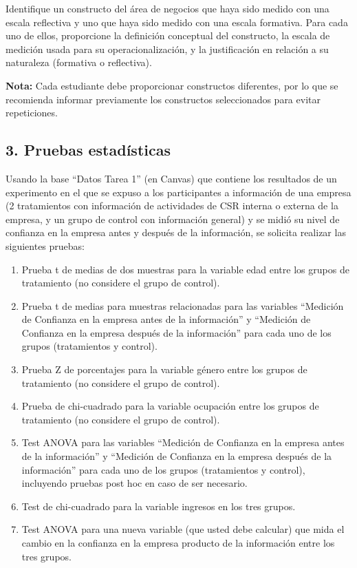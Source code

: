 \documentclass[12pt,letterpaper]{article}
\begin{document}
Identifique un constructo del área de negocios que haya sido medido con una escala reflectiva y uno que haya sido medido con una escala formativa. Para cada uno de ellos, proporcione la definición conceptual del constructo, la escala de medición usada para su operacionalización, y la justificación en relación a su naturaleza (formativa o reflectiva).

\vspace{0.5em}

\textbf{Nota:} Cada estudiante debe proporcionar constructos diferentes, por lo que se recomienda informar previamente los constructos seleccionados para evitar repeticiones.

\vspace{1em}

\subsection*{3. Pruebas estadísticas}

Usando la base ``Datos Tarea 1'' (en Canvas) que contiene los resultados de un experimento en el que se expuso a los participantes a información de una empresa (2 tratamientos con información de actividades de CSR interna o externa de la empresa, y un grupo de control con información general) y se midió su nivel de confianza en la empresa antes y después de la información, se solicita realizar las siguientes pruebas:

\begin{enumerate}[label=\alph*)]
\item Prueba t de medias de dos muestras para la variable edad entre los grupos de tratamiento (no considere el grupo de control).

\item Prueba t de medias para muestras relacionadas para las variables ``Medición de Confianza en la empresa antes de la información'' y ``Medición de Confianza en la empresa después de la información'' para cada uno de los grupos (tratamientos y control).

\item Prueba Z de porcentajes para la variable género entre los grupos de tratamiento (no considere el grupo de control).

\item Prueba de chi-cuadrado para la variable ocupación entre los grupos de tratamiento (no considere el grupo de control).

\item Test ANOVA para las variables ``Medición de Confianza en la empresa antes de la información'' y ``Medición de Confianza en la empresa después de la información'' para cada uno de los grupos (tratamientos y control), incluyendo pruebas post hoc en caso de ser necesario.

\item Test de chi-cuadrado para la variable ingresos en los tres grupos.

\item Test ANOVA para una nueva variable (que usted debe calcular) que mida el cambio en la confianza en la empresa producto de la información entre los tres grupos.
\end{enumerate}
\end{document}
